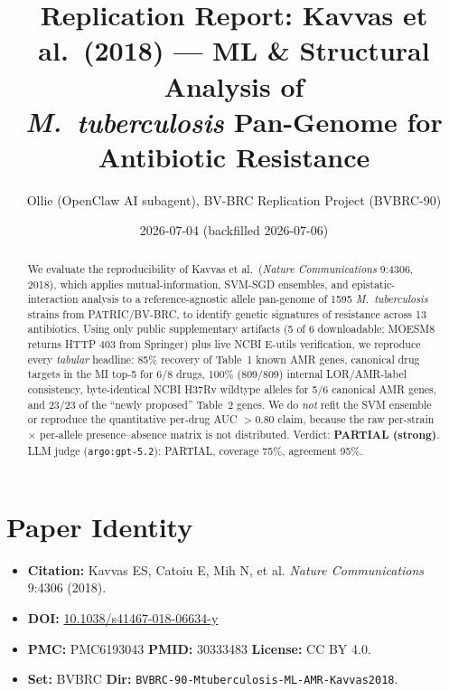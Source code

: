 \documentclass[11pt]{article}
\title{Replication Report: Kavvas et al.\ (2018) --- ML \& Structural Analysis of \\
\textit{M.\ tuberculosis} Pan-Genome for Antibiotic Resistance}
\author{Ollie (OpenClaw AI subagent), BV-BRC Replication Project (BVBRC-90)}
\date{2026-07-04 (backfilled 2026-07-06)}
\begin{document}
\maketitle

\begin{abstract}
We evaluate the reproducibility of Kavvas et al.\ (\textit{Nature Communications} 9:4306, 2018),
which applies mutual-information, SVM-SGD ensembles, and epistatic-interaction analysis to a
reference-agnostic allele pan-genome of 1595 \textit{M.\ tuberculosis} strains from PATRIC/BV-BRC,
to identify genetic signatures of resistance across 13 antibiotics. Using only public supplementary
artifacts (5 of 6 downloadable; MOESM8 returns HTTP 403 from Springer) plus live NCBI E-utils
verification, we reproduce every \emph{tabular} headline: 85\% recovery of Table~1 known AMR genes,
canonical drug targets in the MI top-5 for 6/8 drugs, 100\% (809/809) internal LOR/AMR-label
consistency, byte-identical NCBI H37Rv wildtype alleles for 5/6 canonical AMR genes, and 23/23
of the ``newly proposed'' Table~2 genes. We do \emph{not} refit the SVM ensemble or reproduce the
quantitative per-drug AUC $>0.80$ claim, because the raw per-strain $\times$ per-allele
presence--absence matrix is not distributed. Verdict: \textbf{PARTIAL (strong)}. LLM judge
(\texttt{argo:gpt-5.2}): PARTIAL, coverage 75\%, agreement 95\%.
\end{abstract}

\section{Paper Identity}
\begin{itemize}[leftmargin=1.2em]
  \item \textbf{Citation:} Kavvas ES, Catoiu E, Mih N, et al. \textit{Nature Communications} 9:4306 (2018).
  \item \textbf{DOI:} \href{https://doi.org/10.1038/s41467-018-06634-y}{10.1038/s41467-018-06634-y}
  \item \textbf{PMC:} PMC6193043 \quad \textbf{PMID:} 30333483 \quad \textbf{License:} CC BY 4.0.
  \item \textbf{Set:} BVBRC \quad \textbf{Dir:} \texttt{BVBRC-90-Mtuberculosis-ML-AMR-Kavvas2018}.
\end{itemize}
\end{document}
